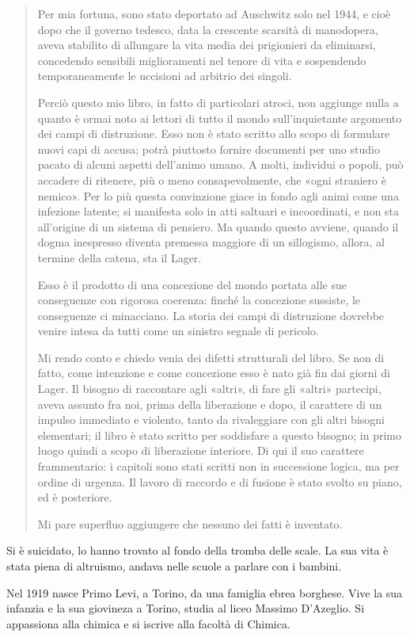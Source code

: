 \documentclass[a4paper, twoside, titlepage]{book}
\newcommand{\citazione}[1]{%
  \begin{quotation}
  \begin{linenumbers}
  \modulolinenumbers[5]
  \begingroup
  \setlength{\parindent}{0cm}
  \noindent #1
  \endgroup
  \end{linenumbers}
  \end{quotation}\setcounter{linenumber}{1}
  }
\begin{document}
\citazione{ Per mia fortuna, sono stato deportato ad Auschwitz solo nel 1944, e cioè dopo che il governo tedesco, data la crescente scarsità di manodopera, aveva stabilito di allungare la vita media dei prigionieri da eliminarsi, concedendo sensibili miglioramenti nel tenore di vita e sospendendo temporaneamente le uccisioni ad arbitrio dei singoli.

Perciò questo mio libro, in fatto di particolari atroci, non aggiunge nulla a quanto è ormai noto ai lettori di tutto il mondo sull'inquietante argomento dei campi di distruzione. Esso non è stato scritto allo scopo di formulare nuovi capi di accusa; potrà piuttosto fornire documenti per uno studio pacato di alcuni aspetti dell'animo umano. A molti, individui o popoli, può accadere di ritenere, più o meno consapevolmente, che «ogni straniero è nemico». Per lo più questa convinzione giace in fondo agli animi come una infezione latente; si manifesta solo in atti saltuari e incoordinati, e non sta all'origine di un sistema di pensiero. Ma quando questo avviene, quando il dogma inespresso diventa premessa maggiore di un sillogismo, allora, al termine della catena, sta il Lager.

Esso è il prodotto di una concezione del mondo portata alle sue conseguenze con rigorosa coerenza: finché la concezione sussiste, le conseguenze ci minacciano. La storia dei campi di distruzione dovrebbe venire intesa da tutti come un sinistro segnale di pericolo.

Mi rendo conto e chiedo venia dei difetti strutturali del libro. Se non di fatto, come intenzione e come concezione esso è nato già fin dai giorni di Lager. Il bisogno di raccontare agli «altri», di fare gli «altri» partecipi, aveva assunto fra noi, prima della liberazione e dopo, il carattere di un impulso immediato e violento, tanto da rivaleggiare con gli altri bisogni elementari; il libro è stato scritto per soddisfare a questo bisogno; in primo luogo quindi a scopo di liberazione interiore. Di qui il suo carattere frammentario: i capitoli sono stati scritti non in successione logica, ma per ordine di urgenza. Il lavoro di raccordo e di fusione è stato svolto su piano, ed è posteriore.

Mi pare superfluo aggiungere che nessuno dei fatti è inventato.}

Si è suicidato, lo hanno trovato al fondo della tromba delle scale. La sua vita è stata piena di altruismo, andava nelle scuole a parlare con i bambini.

Nel 1919 nasce Primo Levi, a Torino, da una famiglia ebrea borghese. Vive la sua infanzia e la sua giovineza a Torino, studia al liceo Massimo D'Azeglio. Si appassiona alla chimica e si iscrive alla facoltà di Chimica.
\end{document}
